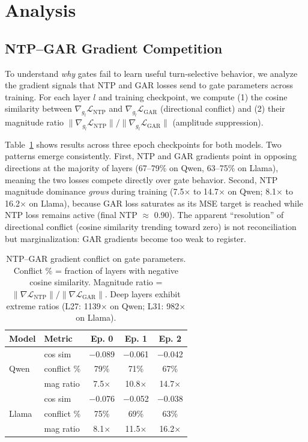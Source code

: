 \documentclass[11pt]{article}
\begin{document}
\section{Analysis}
\label{sec:analysis}

\subsection{NTP--GAR Gradient Competition}
\label{sec:gradient}

To understand \emph{why} gates fail to learn useful turn-selective behavior, we analyze the gradient signals that NTP and GAR losses send to gate parameters across training. For each layer $l$ and training checkpoint, we compute (1) the cosine similarity between $\nabla_{g_l} \mathcal{L}_\text{NTP}$ and $\nabla_{g_l} \mathcal{L}_\text{GAR}$ (directional conflict) and (2) their magnitude ratio $\|\nabla_{g_l} \mathcal{L}_\text{NTP}\| / \|\nabla_{g_l} \mathcal{L}_\text{GAR}\|$ (amplitude suppression).

Table~\ref{tab:gradient-conflict} shows results across three epoch checkpoints for both models. Two patterns emerge consistently. First, NTP and GAR gradients point in opposing directions at the majority of layers (67--79\% on Qwen, 63--75\% on Llama), meaning the two losses compete directly over gate behavior. Second, NTP magnitude dominance \emph{grows} during training (7.5$\times$ to 14.7$\times$ on Qwen; 8.1$\times$ to 16.2$\times$ on Llama), because GAR loss saturates as its MSE target is reached while NTP loss remains active (final NTP $\approx$ 0.90). The apparent ``resolution'' of directional conflict (cosine similarity trending toward zero) is not reconciliation but marginalization: GAR gradients become too weak to register.

\begin{table}[t]
\centering
\small
\begin{tabular}{llccc}
\toprule
\textbf{Model} & \textbf{Metric} & \textbf{Ep. 0} & \textbf{Ep. 1} & \textbf{Ep. 2} \\
\midrule
\multirow{3}{*}{Qwen} & cos sim & $-$0.089 & $-$0.061 & $-$0.042 \\
 & conflict \% & 79\% & 71\% & 67\% \\
 & mag ratio & 7.5$\times$ & 10.8$\times$ & 14.7$\times$ \\
\midrule
\multirow{3}{*}{Llama} & cos sim & $-$0.076 & $-$0.052 & $-$0.038 \\
 & conflict \% & 75\% & 69\% & 63\% \\
 & mag ratio & 8.1$\times$ & 11.5$\times$ & 16.2$\times$ \\
\bottomrule
\end{tabular}
\caption{NTP--GAR gradient conflict on gate parameters. Conflict \% = fraction of layers with negative cosine similarity. Magnitude ratio = $\|\nabla \mathcal{L}_\text{NTP}\| / \|\nabla \mathcal{L}_\text{GAR}\|$. Deep layers exhibit extreme ratios (L27: 1139$\times$ on Qwen; L31: 982$\times$ on Llama).}
\label{tab:gradient-conflict}
\end{table}
\end{document}
